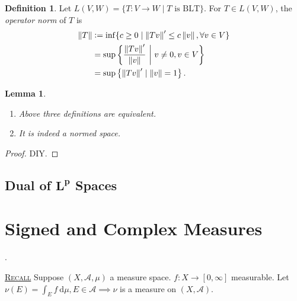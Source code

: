 \documentclass{report}
\newcommand{\cA}{\mathcal{A}}
\newcommand{\df}{\ \mathrm{d}}
\newcommand{\norm}[1]{\left\| #1 \right\|}
\newcommand{\defeq}{\vcentcolon=}
\newcommand{\fancyem}[1]{\underline{\textsc{#1}}}
\newtheorem{lemma}[theorem]{Lemma}
\theoremstyle{definition}
\newtheorem{definition}[theorem]{Definition}
\theoremstyle{remark}
\newcommand*\ttlmath[2]{\texorpdfstring{$\boldsymbol{#1}$}{#2}}
\begin{document}
\begin{definition}
	Let $L(V, W) = \{T: V \to W \mid T \text{ is BLT}\}$. For $T \in L(V, W)$, the \emph{operator norm} of $T$ is
	\begin{align*}
		\norm{T} & \defeq \inf\{c \geq 0 \mid \norm{Tv}' \leq c\norm{v}, \forall v \in V\} \\
		& = \sup\left\{\frac{\norm{Tv}'}{\norm{v}}\ \biggr\rvert\ v \neq 0, v \in V\right\} \\
		& = \sup\left\{\norm{Tv}' \mid \norm{v} = 1\right\}.
	\end{align*}
\end{definition}
\begin{lemma}
	\begin{enumerate}
		\item Above three definitions are equivalent.
		\item It is indeed a normed space.
	\end{enumerate}
\end{lemma}
\begin{proof}
	DIY.
\end{proof}

\section{Dual of \ttlmath{L^p}{Lp} Spaces}

\chapter{Signed and Complex Measures}
\cite[Ch.3]{follandRealAnalysisModern1999}.

\fancyem{Recall} Suppose $(X, \cA, \mu)$ a measure space. $f: X \to [0, \infty]$ measurable. Let $\displaystyle \nu(E) = \int_E f \df \mu, E \in \cA \implies \nu$ is a measure on $(X, \cA)$. 
\end{document}

